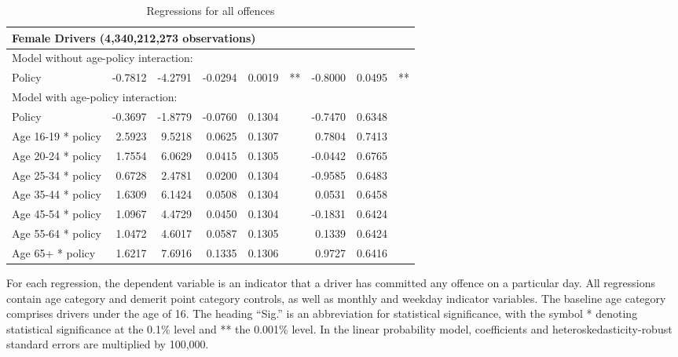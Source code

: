 \begin{table}
\begin{tabular}{l r r r r l r r l}
\hline 

\multicolumn{8}{l}{\textbf{Female Drivers} (4,340,212,273 observations)} \\ 

\hline
\multicolumn{8}{l}{Model without age-policy interaction: } \\ 
Policy                   &  -0.7812        &  -4.2791       &  -0.0294        &  0.0019       &   **       &  -0.8000        &  0.0495       &   **       \\ 
\hline
\multicolumn{8}{l}{Model with age-policy interaction: } \\ 
Policy                   &  -0.3697        &  -1.8779       &  -0.0760        &  0.1304       &            &  -0.7470        &  0.6348       &            \\ 
Age 16-19 * policy   &  2.5923        &  9.5218       &  0.0625        &  0.1307       &            &  0.7804        &  0.7413       &            \\ 
Age 20-24 * policy   &  1.7554        &  6.0629       &  0.0415        &  0.1305       &            &  -0.0442        &  0.6765       &            \\ 
Age 25-34 * policy   &  0.6728        &  2.4781       &  0.0200        &  0.1304       &            &  -0.9585        &  0.6483       &            \\ 
Age 35-44 * policy   &  1.6309        &  6.1424       &  0.0508        &  0.1304       &            &  0.0531        &  0.6458       &            \\ 
Age 45-54 * policy   &  1.0967        &  4.4729       &  0.0450        &  0.1304       &            &  -0.1831        &  0.6424       &            \\ 
Age 55-64 * policy   &  1.0472        &  4.6017       &  0.0587        &  0.1305       &            &  0.1339        &  0.6424       &            \\ 
Age 65+ * policy   &  1.6217        &  7.6916       &  0.1335        &  0.1306       &            &  0.9727        &  0.6416       &            \\ 

\hline 

\end{tabular} 
\caption{Regressions for all offences} 
For each regression, the dependent variable is an indicator that a driver has committed  
any offence on a particular day.  
All regressions contain age category and demerit point category controls, 
as well as monthly and weekday indicator variables. 
The baseline age category comprises drivers under the age of 16. 
The heading ``Sig.'' is an abbreviation for statistical significance, with 
the symbol * denoting statistical significance at the 0.1\% level 
and ** the 0.001\% level. 
In the linear probability model, coefficients and heteroskedasticity-robust standard errors are  
multiplied by 100,000.  
\label{tab:seas_Logit_vs_LPMx100K_regs} 
\end{table} 
 
